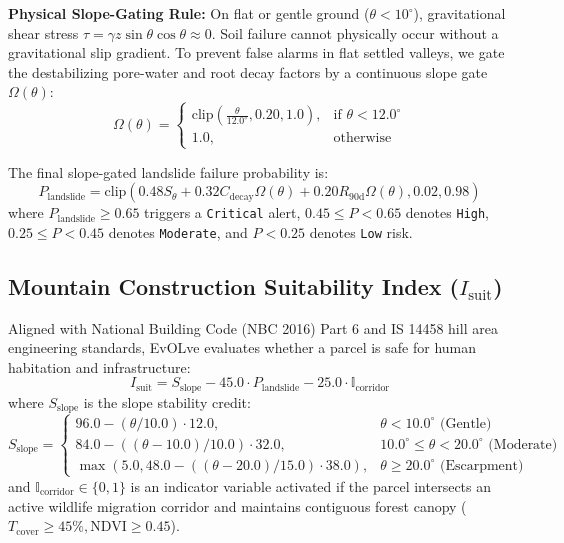 \documentclass[conference]{IEEEtran}
\begin{document}
\noindent
\textbf{Physical Slope-Gating Rule:} On flat or gentle ground ($\theta < 10^\circ$), gravitational shear stress $\tau = \gamma z \sin \theta \cos \theta \approx 0$. Soil failure cannot physically occur without a gravitational slip gradient. To prevent false alarms in flat settled valleys, we gate the destabilizing pore-water and root decay factors by a continuous slope gate $\Omega(\theta)$:
\begin{equation}
\Omega(\theta) = \begin{cases}
\text{clip}\left(\frac{\theta}{12.0^\circ}, 0.20, 1.0\right), & \text{if } \theta < 12.0^\circ \\
1.0, & \text{otherwise}
\end{cases}
\end{equation}

The final slope-gated landslide failure probability is:
\begin{equation}
P_{\text{landslide}} = \text{clip}\left(0.48 S_{\theta} + 0.32 C_{\text{decay}} \Omega(\theta) + 0.20 R_{90\text{d}} \Omega(\theta), 0.02, 0.98\right)
\end{equation}
where $P_{\text{landslide}} \ge 0.65$ triggers a \texttt{Critical} alert, $0.45 \le P < 0.65$ denotes \texttt{High}, $0.25 \le P < 0.45$ denotes \texttt{Moderate}, and $P < 0.25$ denotes \texttt{Low} risk.

\subsection{Mountain Construction Suitability Index ($I_{\text{suit}}$)}
Aligned with National Building Code (NBC 2016) Part 6 and IS 14458 hill area engineering standards, EvOLve evaluates whether a parcel is safe for human habitation and infrastructure:
\begin{equation}
I_{\text{suit}} = S_{\text{slope}} - 45.0 \cdot P_{\text{landslide}} - 25.0 \cdot \mathbb{I}_{\text{corridor}}
\end{equation}
where $S_{\text{slope}}$ is the slope stability credit:
\begin{equation}
S_{\text{slope}} = \begin{cases}
96.0 - (\theta / 10.0) \cdot 12.0, & \theta < 10.0^\circ \text{ (Gentle)} \\
84.0 - ((\theta - 10.0) / 10.0) \cdot 32.0, & 10.0^\circ \le \theta < 20.0^\circ \text{ (Moderate)} \\
\max(5.0, 48.0 - ((\theta - 20.0) / 15.0) \cdot 38.0), & \theta \ge 20.0^\circ \text{ (Escarpment)}
\end{cases}
\end{equation}
and $\mathbb{I}_{\text{corridor}} \in \{0, 1\}$ is an indicator variable activated if the parcel intersects an active wildlife migration corridor and maintains contiguous forest canopy ($T_{\text{cover}} \ge 45\%, \text{NDVI} \ge 0.45$).
\end{document}

